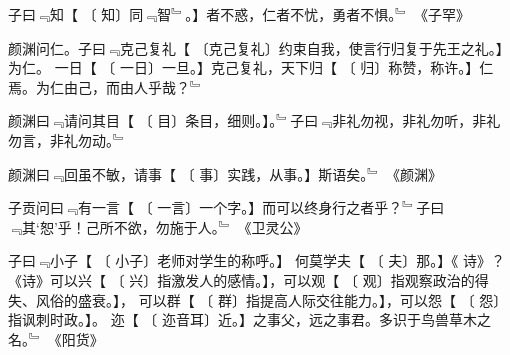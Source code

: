 \documentclass{zhvt-classic}
\begin{document}
子曰﹃知【 \hspace{0.5cm}〔 知〕\hspace{0.5cm}同﹃智﹄。】者不惑，仁者不忧，勇者不惧。﹄ \hspace{1cm} 《子罕》

颜渊问仁。子曰﹃克己复礼【 \hspace{0.5cm}〔克己复礼〕\hspace{0.5cm}约束自我，使言行归复于先王之礼。】为仁。
一日【 \hspace{0.5cm}〔 一日〕\hspace{0.5cm}一旦。】克己复礼，天下归【 \hspace{0.5cm}〔 归〕\hspace{0.5cm}称赞，称许。】仁焉。为仁由己，而由人乎哉？﹄

颜渊曰﹃请问其目【 \hspace{0.5cm}〔 目〕\hspace{0.5cm}条目，细则。】。﹄子曰﹃非礼勿视，非礼勿听，非礼勿言，非礼勿动。﹄

颜渊曰﹃回虽不敏，请事【 \hspace{0.5cm}〔 事〕\hspace{0.5cm}实践，从事。】斯语矣。﹄ \hspace{1cm} 《颜渊》

子贡问曰﹃有一言【 \hspace{0.5cm}〔 一言〕\hspace{0.5cm}一个字。】而可以终身行之者乎？﹄子曰﹃其‘恕’乎！己所不欲，勿施于人。﹄ \hspace{1cm} 《卫灵公》

子曰﹃小子【 \hspace{0.5cm}〔 小子〕\hspace{0.5cm}老师对学生的称呼。】
何莫学夫【 \hspace{0.5cm}〔 夫〕\hspace{0.5cm}那。】《 诗》？
《诗》可以兴【 \hspace{0.5cm}〔 兴〕\hspace{0.5cm}指激发人的感情。】，可以观【 \hspace{0.5cm}〔 观〕\hspace{0.5cm}指观察政治的得失、风俗的盛衰。】，
可以群【 \hspace{0.5cm}〔 群〕\hspace{0.5cm}指提高人际交往能力。】，可以怨【 \hspace{0.5cm}〔 怨〕\hspace{0.5cm}指讽刺时政。】。
迩【 \hspace{0.5cm}〔 迩音耳〕\hspace{0.5cm}近。】之事父，远之事君。多识于鸟兽草木之名。﹄ \hspace{1cm} 《阳货》
\end{document}
